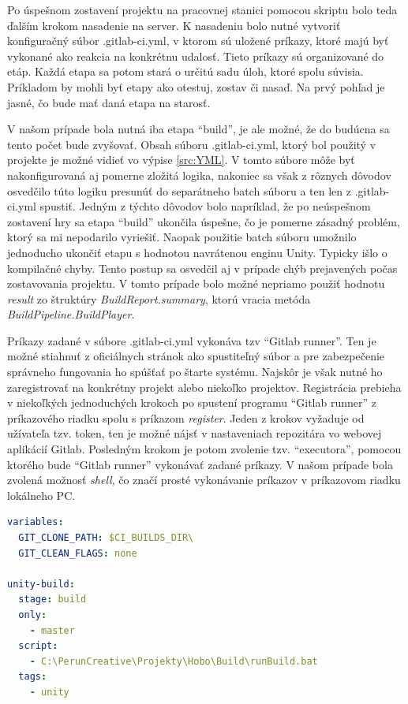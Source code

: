 \documentclass[slovak, bachelorpractice]{diploma}
\begin{document}
Po úspešnom zostavení projektu na pracovnej stanici pomocou skriptu bolo teda ďalším krokom nasadenie na server. K nasadeniu bolo nutné vytvoriť konfiguračný súbor .gitlab-ci.yml, v ktorom sú uložené príkazy, ktoré majú byť vykonané ako reakcia na konkrétnu udalosť. Tieto príkazy sú organizované do etáp. Každá etapa sa potom stará o určitú sadu úloh, ktoré spolu súvisia. Príkladom by mohli byť etapy ako otestuj, zostav či nasaď. Na prvý pohľad je jasné, čo bude mať daná etapa na starosť. 

V našom prípade bola nutná iba etapa \enquote{build}, je ale možné, že do budúcna sa tento počet bude zvyšovať. Obsah súboru .gitlab-ci.yml, ktorý bol použitý v projekte je možné vidieť vo výpise \ref{src:YML}. V tomto súbore môže byť nakonfigurovaná aj pomerne zložitá logika, nakoniec sa však z rôznych dôvodov osvedčilo túto logiku presunúť do separátneho batch súboru a ten len z .gitlab-ci.yml spustiť. Jedným z týchto dôvodov bolo napríklad, že po neúspešnom zostavení hry sa etapa \enquote{build} ukončila úspešne, čo je pomerne zásadný problém, ktorý sa mi nepodarilo vyriešiť. Naopak použitie batch súboru umožnilo jednoducho ukončiť etapu s hodnotou navrátenou enginu Unity. Typicky išlo o kompilačné chyby. Tento postup sa osvedčil aj v prípade chýb prejavených počas zostavovania projektu. V tomto prípade bolo možné nepriamo použiť hodnotu \textit{result} zo štruktúry \textit{BuildReport.summary}, ktorú vracia metóda \textit{BuildPipeline.BuildPlayer}. 

Príkazy zadané v súbore .gitlab-ci.yml vykonáva tzv \enquote{Gitlab runner}. Ten je možné stiahnuť z oficiálnych stránok ako spustiteľný súbor a pre zabezpečenie správneho fungovania ho spúšťať po štarte systému. Najskôr je však nutné ho zaregistrovať na konkrétny projekt alebo niekoľko projektov. Registrácia prebieha v niekoľkých jednoduchých krokoch po spustení programu \enquote{Gitlab runner} z príkazového riadku spolu s príkazom \textit{register}. Jeden z krokov vyžaduje od užívateľa tzv. token, ten je možné nájsť v nastaveniach repozitára vo webovej aplikácií Gitlab. Posledným krokom je potom zvolenie tzv. \enquote{executora}, pomocou ktorého bude  \enquote{Gitlab runner} vykonávať zadané príkazy. V našom prípade bola zvolená možnosť \textit{shell}, čo značí prosté vykonávanie príkazov v príkazovom riadku lokálneho PC.

\vspace{10pt}
\begin{lstlisting}[language=yml,label=src:YML,caption={Obsah súboru .gitlab-ci.yml}]
variables:
  GIT_CLONE_PATH: $CI_BUILDS_DIR\
  GIT_CLEAN_FLAGS: none

unity-build: 
  stage: build
  only:
    - master
  script:
    - C:\PerunCreative\Projekty\Hobo\Build\runBuild.bat
  tags: 
    - unity
\end{lstlisting}
\end{document}
